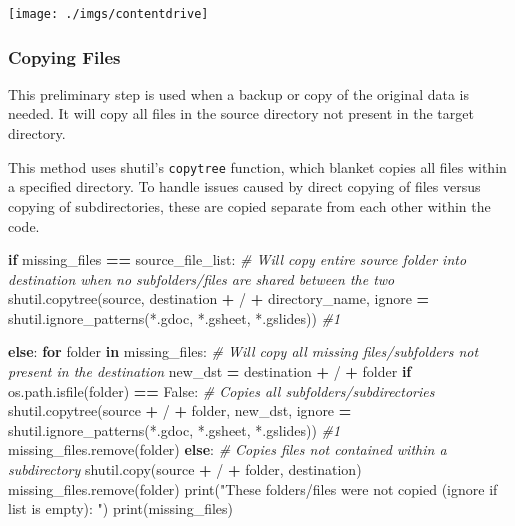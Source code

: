 \documentclass[
]{article}
\newenvironment{Shaded}{\begin{snugshade}}{\end{snugshade}}
\newcommand{\BuiltInTok}[1]{#1}
\newcommand{\CommentTok}[1]{\textcolor[rgb]{0.56,0.35,0.01}{\textit{#1}}}
\newcommand{\ControlFlowTok}[1]{\textcolor[rgb]{0.13,0.29,0.53}{\textbf{#1}}}
\newcommand{\KeywordTok}[1]{\textcolor[rgb]{0.13,0.29,0.53}{\textbf{#1}}}
\newcommand{\NormalTok}[1]{#1}
\newcommand{\OperatorTok}[1]{\textcolor[rgb]{0.81,0.36,0.00}{\textbf{#1}}}
\newcommand{\StringTok}[1]{\textcolor[rgb]{0.31,0.60,0.02}{#1}}
\newcommand{\VariableTok}[1]{\textcolor[rgb]{0.00,0.00,0.00}{#1}}
\begin{document}
\texttt{[image: ./imgs/contentdrive]}

\hypertarget{copying-files}{%
\subsubsection{Copying Files}\label{copying-files}}

This preliminary step is used when a backup or copy of the original data is needed. It will copy all files in the source directory not present in the target directory.

This method uses shutil's \texttt{copytree} function, which blanket copies all files within a specified directory. To handle issues caused by direct copying of files versus copying of subdirectories, these are copied separate from each other within the code.

\begin{Shaded}
\begin{Highlighting}[]
\ControlFlowTok{if}\NormalTok{ missing\_files }\OperatorTok{==}\NormalTok{ source\_file\_list: }\CommentTok{\# Will copy entire source folder into destination when no subfolders/files are shared between the two}
\NormalTok{  shutil.copytree(source, destination }\OperatorTok{+} \StringTok{\textquotesingle{}/\textquotesingle{}} \OperatorTok{+}\NormalTok{ directory\_name, ignore }\OperatorTok{=}\NormalTok{ shutil.ignore\_patterns(}\StringTok{\textquotesingle{}*.gdoc\textquotesingle{}}\NormalTok{, }\StringTok{\textquotesingle{}*.gsheet\textquotesingle{}}\NormalTok{, }\StringTok{\textquotesingle{}*.gslides\textquotesingle{}}\NormalTok{)) }\CommentTok{\#1}

\ControlFlowTok{else}\NormalTok{:}
    \ControlFlowTok{for}\NormalTok{ folder }\KeywordTok{in}\NormalTok{ missing\_files: }\CommentTok{\# Will copy all missing files/subfolders not present in the destination}
\NormalTok{      new\_dst }\OperatorTok{=}\NormalTok{ destination }\OperatorTok{+} \StringTok{\textquotesingle{}/\textquotesingle{}} \OperatorTok{+}\NormalTok{ folder}
      \ControlFlowTok{if}\NormalTok{ os.path.isfile(folder) }\OperatorTok{==} \VariableTok{False}\NormalTok{: }\CommentTok{\# Copies all subfolders/subdirectories}
\NormalTok{        shutil.copytree(source }\OperatorTok{+} \StringTok{\textquotesingle{}/\textquotesingle{}} \OperatorTok{+}\NormalTok{ folder, new\_dst, ignore }\OperatorTok{=}\NormalTok{ shutil.ignore\_patterns(}\StringTok{\textquotesingle{}*.gdoc\textquotesingle{}}\NormalTok{, }\StringTok{\textquotesingle{}*.gsheet\textquotesingle{}}\NormalTok{, }\StringTok{\textquotesingle{}*.gslides\textquotesingle{}}\NormalTok{)) }\CommentTok{\#1}
\NormalTok{        missing\_files.remove(folder)}
      \ControlFlowTok{else}\NormalTok{: }\CommentTok{\# Copies files not contained within a subdirectory}
\NormalTok{        shutil.copy(source }\OperatorTok{+} \StringTok{\textquotesingle{}/\textquotesingle{}} \OperatorTok{+}\NormalTok{ folder, destination)}
\NormalTok{        missing\_files.remove(folder) }
    \BuiltInTok{print}\NormalTok{(}\StringTok{"These folders/files were not copied (ignore if list is empty): "}\NormalTok{)}
    \BuiltInTok{print}\NormalTok{(missing\_files)}
\end{Highlighting}
\end{Shaded}
\end{document}
